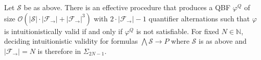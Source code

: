 \documentclass[a4paper,UKenglish,cleveref, autoref, thm-restate]{lipics-v2021}
\begin{document}
\begin{theorem}
	Let $\mathcal S$ be as above. There is an effective procedure that produces a QBF $\varphi^Q$ of size $\mathcal O(|\mathcal S|\cdot|\mathcal F_\to| + |\mathcal F_\to|^3)$ with $2\cdot |\mathcal F_\to|-1$ quantifier alternations such that $\varphi$ is intuitionistically valid if and only if $\varphi^Q$ is not satisfiable. For fixed $N\in\mathbb N$, deciding intuitionistic validity for formulas $\bigwedge \mathcal S\to P$ where $\mathcal S$ is as above and $|\mathcal F_\to| = N$ is therefore in $\Sigma_{2N-1}$.
\end{theorem}

\end{document}
